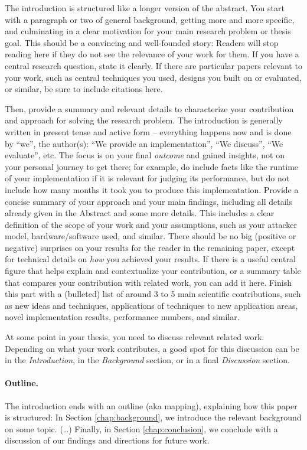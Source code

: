 \documentclass[11pt,titlepage=false]{scrreprt}
\begin{document}
The introduction is structured like a longer version of the abstract.
You start with a paragraph or two of general background, getting more and more specific, and culminating in a clear motivation for your main research problem or thesis goal.
This should be a convincing and well-founded story: Readers will stop reading here if they do not see the relevance of your work for them.
If you have a central research question, state it clearly.
If there are particular papers relevant to your work, such as central techniques you used, designs you built on or evaluated, or similar, be sure to include citations here.

Then, provide a summary and relevant details to characterize your contribution and approach for solving the research problem.
The introduction is generally written in present tense and active form -- everything happens now and is done by ``we'', the author(s):
``We provide an implementation'', ``We discuss'', ``We evaluate'', etc.
The focus is on your final \emph{outcome} and gained insights, not on your personal journey to get there; for example, do include facts like the runtime of your implementation if it is relevant for judging its performance, but do not include how many months it took you to produce this implementation.
Provide a concise summary of your approach and your main findings, including all details already given in the Abstract and some more details.
This includes a clear definition of the scope of your work and your assumptions, such as your attacker model, hardware/software used, and similar.
There should be no big (positive or negative) surprises on your results for the reader in the remaining paper, except for technical details on \emph{how} you achieved your results.
If there is a useful central figure that helps explain and contextualize your contribution, or a summary table that compares your contribution with related work, you can add it here.
Finish this part with a (bulleted) list of around 3 to 5 main scientific contributions, such as new ideas and techniques, applications of techniques to new application areas, novel implementation results, performance numbers, and similar.

At some point in your thesis, you need to discuss relevant related work.
Depending on what your work contributes, a good spot for this discussion can be in the \emph{Introduction}, in the \emph{Background} section, or in a final \emph{Discussion} section.

\paragraph{Outline.}
The introduction ends with an outline (aka mapping), explaining how this paper is structured:
In Section \ref{chap:background}, we introduce the relevant background on some topic.
(\dots)
Finally, in Section \ref{chap:conclusion}, we conclude with a discussion of our findings and directions for future work.
\end{document}
